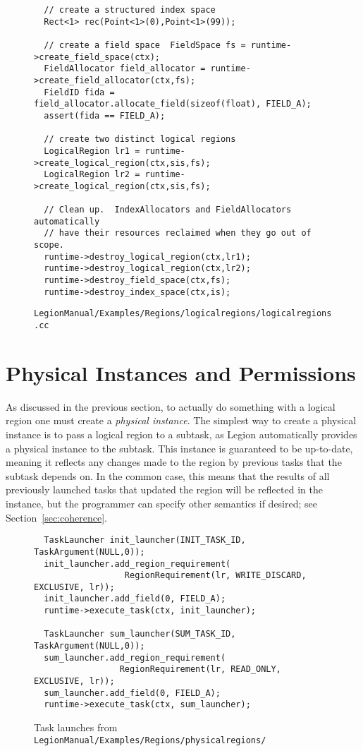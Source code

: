\documentclass[11pt]{book}
\newcommand{\legionbook}[1]{{\tt LegionManual/Examples/#1}}
\begin{document}
\begin{figure}
{\small
\begin{lstlisting}
  // create a structured index space
  Rect<1> rec(Point<1>(0),Point<1>(99));

  // create a field space  FieldSpace fs = runtime->create_field_space(ctx);
  FieldAllocator field_allocator = runtime->create_field_allocator(ctx,fs);
  FieldID fida = field_allocator.allocate_field(sizeof(float), FIELD_A);
  assert(fida == FIELD_A);

  // create two distinct logical regions   
  LogicalRegion lr1 = runtime->create_logical_region(ctx,sis,fs);
  LogicalRegion lr2 = runtime->create_logical_region(ctx,sis,fs);

  // Clean up.  IndexAllocators and FieldAllocators automatically
  // have their resources reclaimed when they go out of scope.
  runtime->destroy_logical_region(ctx,lr1);
  runtime->destroy_logical_region(ctx,lr2);
  runtime->destroy_field_space(ctx,fs);
  runtime->destroy_index_space(ctx,is);
\end{lstlisting}
}
\caption{\legionbook{Regions/logicalregions/logicalregions.cc}}
\label{fig:lr1}
\end{figure}

\section{Physical Instances and Permissions}
\label{sec:permissions}

As discussed in the previous section, to actually do something with a logical region one must create
a {\em physical instance}.  The simplest way to create a physical instance is to pass a logical region to a
subtask, as Legion automatically provides a physical instance to the subtask.  This instance is guaranteed to be
up-to-date, meaning it reflects any changes made to the region by previous tasks that the subtask depends on.
In the common case, this means that the results of all previously launched tasks that updated the region will be
reflected in the instance, but the programmer can specify other semantics if desired; see Section~\ref{sec:coherence}.

\begin{figure}
{\small
\begin{lstlisting}
  TaskLauncher init_launcher(INIT_TASK_ID, TaskArgument(NULL,0));
  init_launcher.add_region_requirement(
                  RegionRequirement(lr, WRITE_DISCARD, EXCLUSIVE, lr));
  init_launcher.add_field(0, FIELD_A);
  runtime->execute_task(ctx, init_launcher);

  TaskLauncher sum_launcher(SUM_TASK_ID, TaskArgument(NULL,0));
  sum_launcher.add_region_requirement(
                 RegionRequirement(lr, READ_ONLY, EXCLUSIVE, lr));
  sum_launcher.add_field(0, FIELD_A);
  runtime->execute_task(ctx, sum_launcher);
\end{lstlisting}
}
\caption{Task launches from \legionbook{Regions/physicalregions/}}
\label{fig:permissions}
\end{figure}
\end{document}
